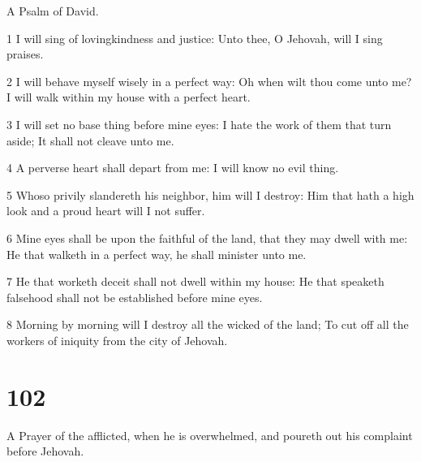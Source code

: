\par A Psalm of David.

\par 1 I will sing of lovingkindness and justice: Unto thee, O Jehovah, will I sing praises.
\par 2 I will behave myself wisely in a perfect way: Oh when wilt thou come unto me? I will walk within my house with a perfect heart.
\par 3 I will set no base thing before mine eyes: I hate the work of them that turn aside; It shall not cleave unto me.
\par 4 A perverse heart shall depart from me: I will know no evil thing.
\par 5 Whoso privily slandereth his neighbor, him will I destroy: Him that hath a high look and a proud heart will I not suffer.
\par 6 Mine eyes shall be upon the faithful of the land, that they may dwell with me: He that walketh in a perfect way, he shall minister unto me.
\par 7 He that worketh deceit shall not dwell within my house: He that speaketh falsehood shall not be established before mine eyes.
\par 8 Morning by morning will I destroy all the wicked of the land; To cut off all the workers of iniquity from the city of Jehovah.

\chapter{102}

\par A Prayer of the afflicted, when he is overwhelmed, and poureth out his complaint before Jehovah.

